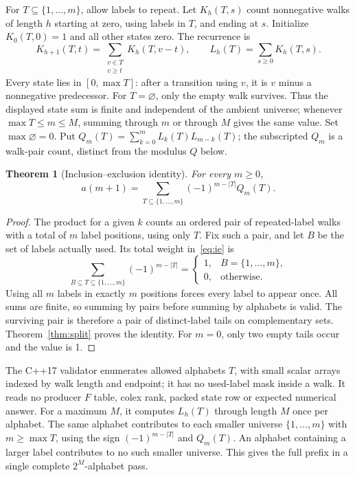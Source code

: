\documentclass[11pt]{article}
\newtheorem{theorem}{Theorem}[section]
\theoremstyle{definition}
\theoremstyle{remark}
\begin{document}
For $T\subseteq\{1,\ldots,m\}$, allow labels to repeat. Let
$K_h(T,s)$ count nonnegative walks of length $h$ starting at zero,
using labels in $T$, and ending at $s$. Initialize $K_0(T,0)=1$ and
all other states zero. The recurrence is
\begin{equation}
 K_{h+1}(T,t)=\sum_{\substack{v\in T\\v\geq t}}K_h(T,v-t),
 \qquad L_h(T)=\sum_{s\geq0}K_h(T,s).
 \label{eq:walk}
\end{equation}
Every state lies in $[0,\max T]$: after a transition using $v$, it is
$v$ minus a nonnegative predecessor. For $T=\varnothing$, only the empty
walk survives. Thus the displayed state sum is finite and independent of
the ambient universe; whenever $\max T\leq m\leq M$, summing through
$m$ or through $M$ gives the same value. Set $\max\varnothing=0$.
Put $Q_m(T)=\sum_{k=0}^{m}L_k(T)L_{m-k}(T)$; the subscripted $Q_m$
is a walk-pair count, distinct from the modulus $Q$ below.

\begin{theorem}[Inclusion--exclusion identity]
\label{thm:ie}
For every $m\geq0$,
\begin{equation}
 a(m+1)=\sum_{T\subseteq\{1,\ldots,m\}}
 (-1)^{m-|T|}Q_m(T).
 \label{eq:ie}
\end{equation}
\end{theorem}
\begin{proof}
The product for a given $k$ counts an ordered pair of repeated-label walks with a total
of $m$ label positions, using only $T$. Fix such a pair, and let $B$ be
the set of labels actually used. Its total weight in~\eqref{eq:ie} is
\[
 \sum_{B\subseteq T\subseteq\{1,\ldots,m\}}(-1)^{m-|T|}
 =\begin{cases}1,&B=\{1,\ldots,m\},\\0,&\text{otherwise}.\end{cases}
\]
Using all $m$ labels in exactly $m$ positions forces every label to appear
once. All sums are finite, so summing by pairs before summing by alphabets
is valid. The surviving pair is therefore a pair of distinct-label tails on
complementary sets. Theorem~\ref{thm:split} proves the identity.
For $m=0$, only two empty tails occur and the value is 1.
\end{proof}

The C++17 validator enumerates allowed alphabets $T$, with small scalar
arrays indexed by walk length and endpoint; it has no used-label mask
inside a walk. It reads no producer $F$ table, colex rank, packed state row
or expected numerical answer. For a maximum $M$, it computes $L_h(T)$
through length $M$ once per alphabet. The same alphabet contributes to
each smaller universe $\{1,\ldots,m\}$ with $m\geq\max T$, using
the sign $(-1)^{m-|T|}$ and $Q_m(T)$.
An alphabet containing a larger label contributes to no such smaller universe.
This gives the full prefix in a single complete $2^M$-alphabet pass.
\end{document}

